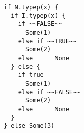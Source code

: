 \begin{lstlisting}[style=scalaioScala]
if N.typep(x) {
  if I.typep(x) {
    if ~~FALSE~~
      Some(1)
    else if ~~TRUE~~
      Some(2)
    else      None
  } else {
    if true
      Some(1)
    else if ~~FALSE~~
      Some(2)
    else      None
  }
} else Some(3)
\end{lstlisting}
